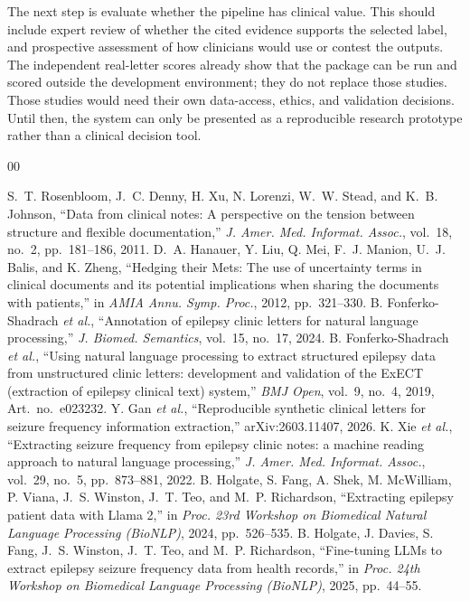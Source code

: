 \documentclass[conference]{IEEEtran}
\begin{document}
The next step is evaluate whether the pipeline has clinical value. This should include 
expert review of whether the cited evidence supports the selected label, and
prospective assessment of how clinicians would use or contest the outputs.
The independent real-letter scores already show that the package can be
run and scored outside the development environment; they do not replace
those studies. Those studies would need their own data-access, ethics, and
validation decisions. Until then, the system can only be presented as a
reproducible research prototype rather than a clinical decision tool.

\begin{thebibliography}{00}

 S.~T. Rosenbloom, J.~C. Denny, H. Xu, N. Lorenzi, W.~W. Stead, and K.~B. Johnson, ``Data from clinical notes: A perspective on the tension between structure and flexible documentation,'' \emph{J. Amer. Med. Informat. Assoc.}, vol.~18, no.~2, pp.~181--186, 2011.
 D.~A. Hanauer, Y. Liu, Q. Mei, F.~J. Manion, U.~J. Balis, and K. Zheng, ``Hedging their Mets: The use of uncertainty terms in clinical documents and its potential implications when sharing the documents with patients,'' in \emph{AMIA Annu. Symp. Proc.}, 2012, pp.~321--330.
 B. Fonferko-Shadrach \emph{et al.}, ``Annotation of epilepsy clinic letters for natural language processing,'' \emph{J. Biomed. Semantics}, vol.~15, no.~17, 2024.
 B. Fonferko-Shadrach \emph{et al.}, ``Using natural language processing to extract structured epilepsy data from unstructured clinic letters: development and validation of the ExECT (extraction of epilepsy clinical text) system,'' \emph{BMJ Open}, vol.~9, no.~4, 2019, Art.~no.~e023232.
 Y. Gan \emph{et al.}, ``Reproducible synthetic clinical letters for seizure frequency information extraction,'' arXiv:2603.11407, 2026.
 K. Xie \emph{et al.}, ``Extracting seizure frequency from epilepsy clinic notes: a machine reading approach to natural language processing,'' \emph{J. Amer. Med. Informat. Assoc.}, vol.~29, no.~5, pp.~873--881, 2022.
 B. Holgate, S. Fang, A. Shek, M. McWilliam, P. Viana, J.~S. Winston, J.~T. Teo, and M.~P. Richardson, ``Extracting epilepsy patient data with Llama 2,'' in \emph{Proc. 23rd Workshop on Biomedical Natural Language Processing (BioNLP)}, 2024, pp.~526--535.
 B. Holgate, J. Davies, S. Fang, J.~S. Winston, J.~T. Teo, and M.~P. Richardson, ``Fine-tuning LLMs to extract epilepsy seizure frequency data from health records,'' in \emph{Proc. 24th Workshop on Biomedical Language Processing (BioNLP)}, 2025, pp.~44--55.

\end{thebibliography}
\end{document}
